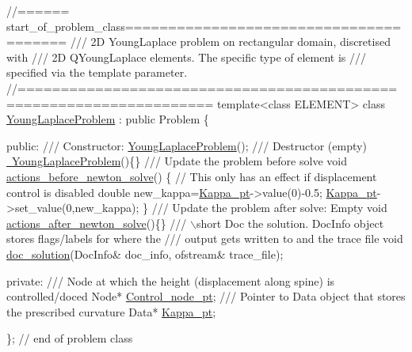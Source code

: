  
\begin{DoxyCodeInclude}
\textcolor{comment}{//====== start\_of\_problem\_class=======================================}
\textcolor{comment}{/// 2D YoungLaplace problem on rectangular domain, discretised with}
\textcolor{comment}{}\textcolor{comment}{/// 2D QYoungLaplace elements. The specific type of element is}
\textcolor{comment}{}\textcolor{comment}{/// specified via the template parameter.}
\textcolor{comment}{}\textcolor{comment}{//====================================================================}
\textcolor{keyword}{template}<\textcolor{keyword}{class} ELEMENT> 
\textcolor{keyword}{class }\hyperlink{classYoungLaplaceProblem}{YoungLaplaceProblem} : \textcolor{keyword}{public} Problem
\{

\textcolor{keyword}{public}:
\textcolor{comment}{}
\textcolor{comment}{ /// Constructor: }
\textcolor{comment}{} \hyperlink{classYoungLaplaceProblem_a4ea552f351994849e9ab597ef2da797a}{YoungLaplaceProblem}();
\textcolor{comment}{}
\textcolor{comment}{ /// Destructor (empty)}
\textcolor{comment}{} \hyperlink{classYoungLaplaceProblem_aa3482606bfd86a3db9d2dec86ba75f14}{~YoungLaplaceProblem}()\{\}
\textcolor{comment}{}
\textcolor{comment}{ /// Update the problem before solve }
\textcolor{comment}{} \textcolor{keywordtype}{void} \hyperlink{classYoungLaplaceProblem_a93dd45313d28c3b9b0b51e34d14ebd24}{actions\_before\_newton\_solve}()
  \{
   \textcolor{comment}{// This only has an effect if displacement control is disabled}
   \textcolor{keywordtype}{double} new\_kappa=\hyperlink{classYoungLaplaceProblem_a78d1ae3b73777674003b2c9794ea9b43}{Kappa\_pt}->value(0)-0.5;
   \hyperlink{classYoungLaplaceProblem_a78d1ae3b73777674003b2c9794ea9b43}{Kappa\_pt}->set\_value(0,new\_kappa);
  \}
\textcolor{comment}{}
\textcolor{comment}{ /// Update the problem after solve: Empty}
\textcolor{comment}{} \textcolor{keywordtype}{void} \hyperlink{classYoungLaplaceProblem_a8eed49ad1c6247cc293a584ab9262efc}{actions\_after\_newton\_solve}()\{\}
\textcolor{comment}{}
\textcolor{comment}{ /// \(\backslash\)short Doc the solution. DocInfo object stores flags/labels for where the}
\textcolor{comment}{ /// output gets written to and the trace file}
\textcolor{comment}{} \textcolor{keywordtype}{void} \hyperlink{classYoungLaplaceProblem_a16f10e66457718eca76d1335dbed8f12}{doc\_solution}(DocInfo& doc\_info, ofstream& trace\_file);

\textcolor{keyword}{private}:
\textcolor{comment}{}
\textcolor{comment}{ /// Node at which the height (displacement along spine) is controlled/doced}
\textcolor{comment}{} Node* \hyperlink{classYoungLaplaceProblem_a1d659f1b2d73140a5d52889f9581d12f}{Control\_node\_pt};
\textcolor{comment}{}
\textcolor{comment}{ /// Pointer to Data object that stores the prescribed curvature}
\textcolor{comment}{} Data* \hyperlink{classYoungLaplaceProblem_a78d1ae3b73777674003b2c9794ea9b43}{Kappa\_pt};

\}; \textcolor{comment}{// end of problem class}

\end{DoxyCodeInclude}





